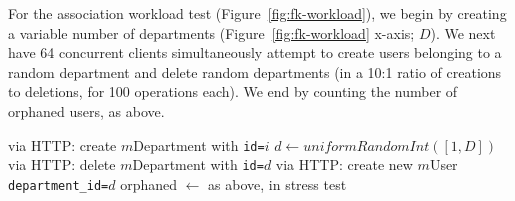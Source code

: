 For the association workload test (Figure~\ref{fig:fk-workload}), we begin by creating a variable number of departments (Figure~\ref{fig:fk-workload} x-axis; $D$). We next have 64 concurrent clients simultaneously attempt to create users belonging to a random department and delete random departments (in a 10:1 ratio of creations to deletions, for 100 operations each). We end by counting the number of orphaned users, as above. \vspace{-1em}
\begin{algorithm}[H]
\begin{algorithmic}
    \State via HTTP: create $m$Department with \texttt{id=$i$}
  \EndFor
      \State $d \gets uniformRandomInt([1, D])$
        \State via HTTP: delete $m$Department with \texttt{id=$d$}
      \Else
        \State via HTTP: create new $m$User \texttt{department\_id=$d$}
      \EndIf        
   \EndParFor
   \State orphaned $\gets $ as above, in stress test
\EndFor
\end{algorithmic}
\end{algorithm}
